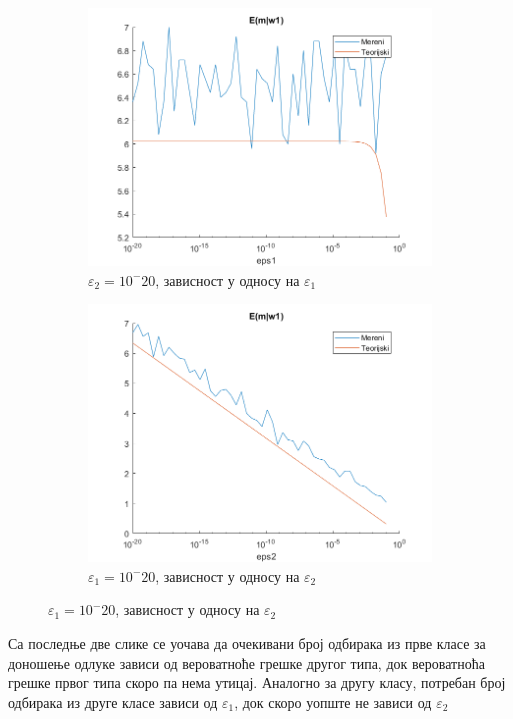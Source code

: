 \begin{figure}[htb!]\caption{Графици зависности}
\begin{subfigure}{.6\textwidth}
\centering
\includegraphics[width=1\linewidth]{pictures/2/WaldoE1}
\caption{$\varepsilon_2 = 10^-20$, зависност у односу на $\varepsilon_1$}\label{pic:eps1Dep}
\end{subfigure}
\begin{subfigure}{.55\textwidth}
\centering
\includegraphics[width=1\linewidth]{pictures/2/WaldoE2}
\caption{$\varepsilon_1 = 10^-20$, зависност у односу на $\varepsilon_2$}\label{pic:eps2Dep}
\end{subfigure}
\end{figure}

Са последње две слике се  уочава да очекивани број одбирака из прве класе за доношење одлуке  зависи од вероватноће грешке другог типа, док вероватноћа грешке првог типа скоро па нема утицај. Аналогно за другу класу, потребан број одбирака из друге класе  зависи од $\varepsilon_1$, док скоро уопште не зависи од $\varepsilon_2$